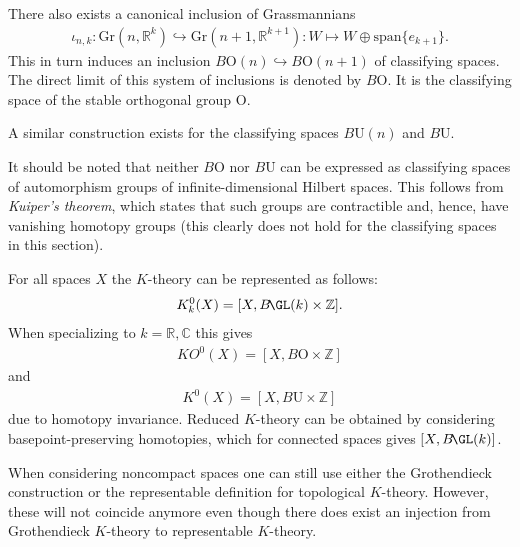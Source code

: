 {\begin{property}
        There also exists a canonical inclusion of Grassmannians
        \begin{gather}
            \iota_{n,k}:\mathrm{Gr}(n,\mathbb{R}^k)\hookrightarrow \mathrm{Gr}(n+1,\mathbb{R}^{k+1}):W\mapsto W\oplus\mathrm{span}\{e_{k+1}\}.
        \end{gather}
        This in turn induces an inclusion $B\mathrm{O}(n)\hookrightarrow B\mathrm{O}(n+1)$ of classifying spaces. The direct limit of this system of inclusions is denoted by $B\mathrm{O}$. It is the classifying space of the stable orthogonal group $\mathrm{O}$.
    \end{property}
    \begin{remark}
        A similar construction exists for the classifying spaces $B\mathrm{U}(n)$ and $B\mathrm{U}$.
    \end{remark}
    \begin{remark}\label{k:kuiper_remark}
        It should be noted that neither $B\mathrm{O}$ nor $B\mathrm{U}$ can be expressed as classifying spaces of automorphism groups of infinite-dimensional Hilbert spaces. This follows from \textit{Kuiper's theorem}, which states that such groups are contractible and, hence, have vanishing homotopy groups (this clearly does not hold for the classifying spaces in this section).
    \end{remark}

    \begin{property}
        For all spaces $X$ the $K$-theory can be represented as follows:
        \begin{gather}
            K^0_k(X) = [X,B\!\GL(k)\times\mathbb{Z}].
        \end{gather}
        When specializing to $k=\mathbb{R},\mathbb{C}$ this gives
        \begin{gather}
            KO^0(X) = [X,B\mathrm{O}\times\mathbb{Z}]
        \end{gather}
        and
        \begin{gather}
            K^0(X) = [X,B\mathrm{U}\times\mathbb{Z}]
        \end{gather}
        due to homotopy invariance. Reduced $K$-theory can be obtained by considering basepoint-preserving homotopies, which for connected spaces gives $[X,B\!\GL(k)]$.
    \end{property}

    \begin{remark}
        When considering noncompact spaces one can still use either the Grothendieck construction or the representable definition for topological $K$-theory. However, these will not coincide anymore even though there does exist an injection from Grothendieck $K$-theory to representable $K$-theory.
    \end{remark}

}
